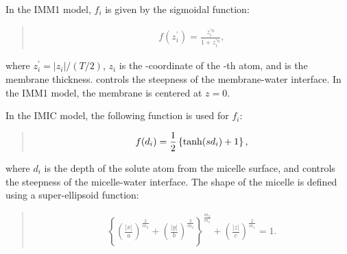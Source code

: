 \documentclass[a4paper,11pt,oneside,english]{sphinxmanual}
\begin{document}
In the IMM1 model, \(f_i\) is given by the sigmoidal function:
\begin{quote}

\vspace{-5mm}
\begin{equation*}
\begin{split}f(z_i^{\prime}) = {\frac{z_i^{\prime n}}{1 + z_i^{\prime n}}},\end{split}
\end{equation*}
\vspace{-3mm}
\end{quote}

where \(z_i^{\prime} = |z_i|/(T/2)\), \(z_i\) is the -coordinate of the -th atom,
and  is the membrane thickness.  controls the steepness of the membrane-water interface.
In the IMM1 model, the membrane is centered at \(z = 0\).

In the IMIC model, the following function is used for \(f_i\):
\begin{quote}

\vspace{-5mm}
\begin{equation*}
\begin{split}f(d_i) = {\frac{1}{2}} \left\{ {\rm{tanh}}(sd_i) + 1 \right\},\end{split}
\end{equation*}
\vspace{-3mm}
\end{quote}

where \(d_i\) is the depth of the solute atom  from the micelle surface, and
 controls the steepness of the micelle-water interface.
The shape of the micelle is defined using a super-ellipsoid function:
\begin{quote}

\vspace{-5mm}
\begin{equation*}
\begin{split}\left\{ \left( {\frac{|x|}{a}} \right)^{\frac{2}{m_2}}  + \left( {\frac{|y|}{b}} \right)^{\frac{2}{m_2}} \right\}^{\frac{m_2}{m_1}} + \left( {\frac{|z|}{c}} \right)^{\frac{2}{m_1}} = 1.\end{split}
\end{equation*}
\vspace{-3mm}
\end{quote}
\end{document}
